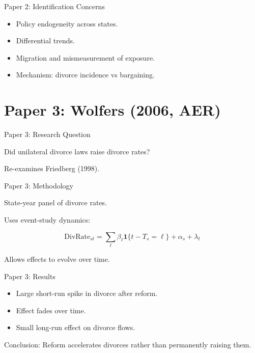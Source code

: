 \documentclass[aspectratio=169]{beamer}
\begin{document}
\begin{frame}{Paper 2: Identification Concerns}

\begin{itemize}
    \item Policy endogeneity across states.
    \item Differential trends.
    \item Migration and mismeasurement of exposure.
    \item Mechanism: divorce incidence vs bargaining.
\end{itemize}

\end{frame}

\section{Paper 3: Wolfers (2006, AER)}

\begin{frame}{Paper 3: Research Question}

Did unilateral divorce laws raise divorce rates?

Re-examines Friedberg (1998).

\end{frame}

\begin{frame}{Paper 3: Methodology}

State-year panel of divorce rates.

Uses event-study dynamics:

\[
\text{DivRate}_{st}
=
\sum_{\ell} \beta_\ell \mathbf{1}\{t-T_s=\ell\}
+ \alpha_s + \lambda_t
\]

Allows effects to evolve over time.

\end{frame}

\begin{frame}{Paper 3: Results}

\begin{itemize}
    \item Large short-run spike in divorce after reform.
    \item Effect fades over time.
    \item Small long-run effect on divorce flows.
\end{itemize}

Conclusion:
Reform accelerates divorces rather than permanently raising them.

\end{frame}
\end{document}
